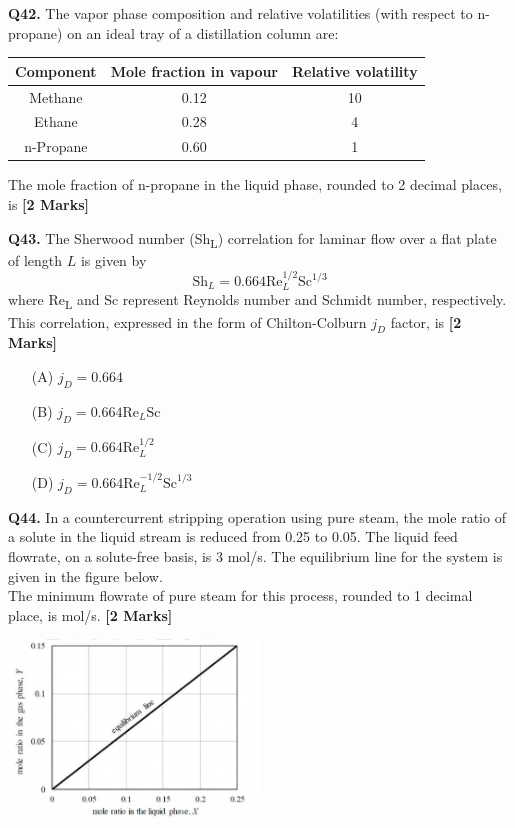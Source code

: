 \documentclass[11pt]{article}
\newcommand{\questionb}[2]{
    \noindent\textbf{Q#2.} #1 \hfill \textbf{[2 Marks]}
}
\begin{document}
\questionb{The vapor phase composition and relative volatilities (with respect to n-propane) on an ideal tray of a distillation column are:  
\begin{center}
\begin{tabular}{|c|c|c|}
\hline
Component & Mole fraction in vapour & Relative volatility \\
\hline
Methane & 0.12 & 10 \\
Ethane & 0.28 & 4 \\
n-Propane & 0.60 & 1 \\
\hline
\end{tabular}
\end{center}
The mole fraction of n-propane in the liquid phase, rounded to 2 decimal places, is}{42}
\vspace{0.5cm}

\questionb{The Sherwood number (Sh\textsubscript{L}) correlation for laminar flow over a flat plate of length \( L \) is given by  
\[
\text{Sh}_L = 0.664 \text{Re}_L^{1/2} \text{Sc}^{1/3}
\]  
where Re\textsubscript{L} and Sc represent Reynolds number and Schmidt number, respectively.  
This correlation, expressed in the form of Chilton-Colburn \( j_D \) factor, is}{43}
\begin{enumerate}
    \item[(A)] \( j_D = 0.664 \)  
    \item[(B)] \( j_D = 0.664 \text{Re}_L \text{Sc} \)  
    \item[(C)] \( j_D = 0.664 \text{Re}_L^{1/2} \)  
    \item[(D)] \( j_D = 0.664 \text{Re}_L^{-1/2} \text{Sc}^{1/3} \)  
\end{enumerate}
\vspace{0.5cm}

\questionb{In a countercurrent stripping operation using pure steam, the mole ratio of a solute in the liquid stream is reduced from 0.25 to 0.05. The liquid feed flowrate, on a solute-free basis, is 3 mol/s. The equilibrium line for the system is given in the figure below.  
\\ The minimum flowrate of pure steam for this process, rounded to 1 decimal place, is mol/s.}{44}
\begin{center}
\includegraphics[width=0.5\textwidth]{figures/44.png}
\end{center}
\vspace{0.5cm}
\end{document}
